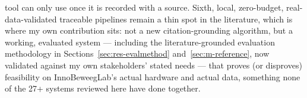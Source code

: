 tool can only use once it is recorded with a source. Sixth, local, zero-budget, real-data-validated traceable pipelines remain a thin spot in the literature, which is where my own contribution sits: not a new citation-grounding algorithm, but a working, evaluated system — including the literature-grounded evaluation methodology in Sections~\ref{sec:res-evalmethod} and~\ref{sec:m-reference}, now validated against my own stakeholders' stated needs — that proves (or disproves) feasibility on InnoBeweegLab's actual hardware and actual data, something none of the 27+ systems reviewed here have done together.


